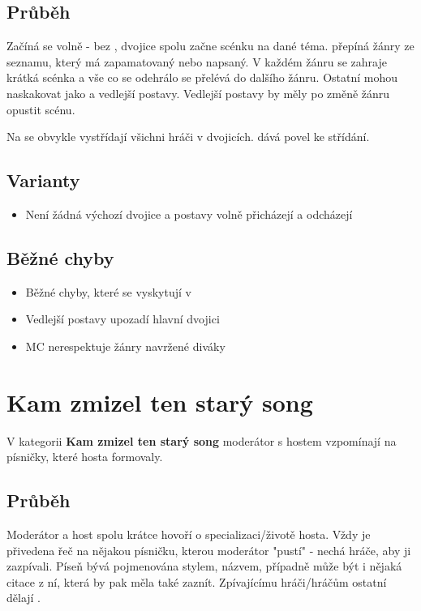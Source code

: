 \documentclass[main.tex]{subfiles}
\begin{document}
 
\subsection{Průběh} Začíná se volně - bez , dvojice spolu začne scénku na dané téma.  přepíná žánry ze seznamu, který má zapamatovaný nebo napsaný. V každém žánru se zahraje krátká scénka a vše co se odehrálo se přelévá do dalšího žánru. Ostatní  mohou naskakovat jako  a vedlejší postavy. Vedlejší postavy by měly po změně žánru opustit scénu.  
 
Na  se obvykle vystřídají všichni hráči v dvojicích.  dává povel ke střídání. 
 
\subsection{ Varianty } \begin{itemize}
\item Není žádná výchozí dvojice a postavy volně přicházejí a odcházejí
\end{itemize}
 
\subsection{ Běžné chyby } \begin{itemize}
\item Běžné chyby, které se vyskytují v 
\item Vedlejší postavy upozadí hlavní dvojici
\item MC nerespektuje žánry navržené diváky
\end{itemize}
 
 
 
 
 
\needspace{5cm} \section{Kam zmizel ten starý song} \label{kam zmizel ten starý song}  
 
 
V kategorii \textbf{Kam zmizel ten starý song}{} moderátor s hostem vzpomínají na písničky, které hosta formovaly. 
 
 
\subsection{Průběh} Moderátor a host spolu krátce hovoří o specializaci/životě hosta. 
Vždy je přivedena řeč na nějakou písničku, kterou moderátor "pustí"{} - nechá hráče, aby ji zazpívali. 
Píseň bývá pojmenována stylem, názvem, případně může být i nějaká citace z ní, která by pak měla také zaznít. 
Zpívajícímu hráči/hráčům ostatní dělají . 
 
\end{document}
